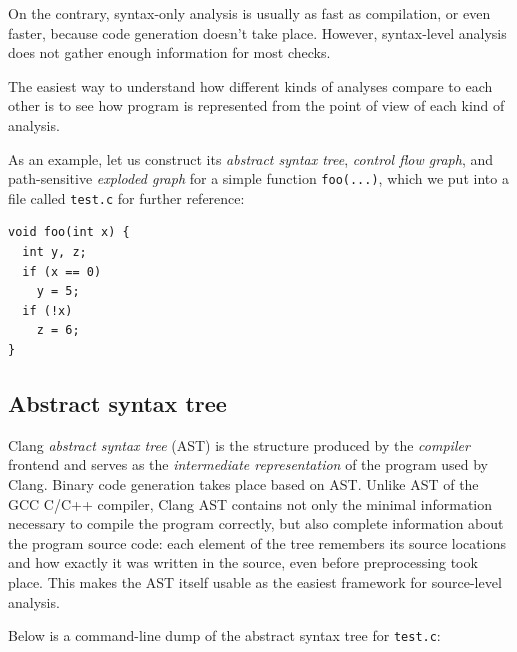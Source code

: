 \documentclass[a4paper,12pt]{article}
\newenvironment{nobr}{\begin{minipage}{\textwidth}\setlength\parskip{1em}
}{\end{minipage}\ignorespacesafterend}
\begin{document}
On the contrary, syntax-only analysis is usually as fast as compilation, or even faster, because code generation doesn't take place. However, syntax-level analysis does not gather enough information for most checks.

The easiest way to understand how different kinds of analyses compare to each other is to see how program is represented from the point of view of each kind of analysis.

\begin{nobr}
As an example, let us construct its \emph{abstract syntax tree}, \emph{control flow graph}, and path-sensitive \emph{exploded graph} for a simple function \lstinline|foo(...)|, which we put into a file called \lstinline|test.c| for further reference:

\begin{lstlisting}[style=cplusplus,title=\lstinline|test.c|]
void foo(int x) {
  int y, z;
  if (x == 0)
    y = 5;
  if (!x)
    z = 6;
}
\end{lstlisting}
\end{nobr}

\subsection{Abstract syntax tree}

Clang \emph{abstract syntax tree} (AST) is the structure produced by the \emph{compiler} frontend and serves as the \emph{intermediate representation} of the program used by Clang. Binary code generation takes place based on AST. Unlike AST of the GCC C/C++ compiler, Clang AST contains not only the minimal information necessary to compile the program correctly, but also complete information about the program source code: each element of the tree remembers its source locations and how exactly it was written in the source, even before preprocessing took place. This makes the AST itself usable as the easiest framework for source-level analysis.

Below is a command-line dump of the abstract syntax tree for \lstinline|test.c|:
\end{document}
